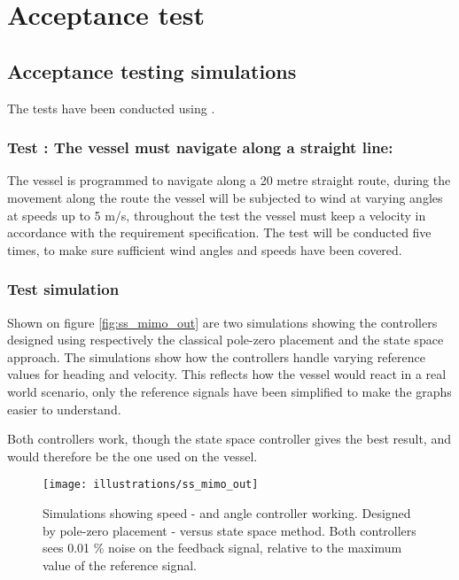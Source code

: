 \chapter{Acceptance test}


\section{Acceptance testing simulations}
The tests have been conducted using \MATLAB.

\subsection*{Test : The vessel must navigate along a straight line:}
The vessel is programmed to navigate along a 20 metre straight route, during the movement along the route the vessel will be subjected to wind at varying angles at speeds up to 5 m/s, throughout the test the vessel must keep a velocity in accordance with the requirement specification. The test will be conducted five times, to make sure sufficient wind angles and speeds have been covered.


\subsection{Test simulation}
Shown on figure \vref{fig:ss_mimo_out} are two simulations showing the controllers designed using respectively the classical pole-zero placement and the state space approach. The simulations show how the controllers handle varying reference values for heading and velocity. This reflects how the vessel would react in a real world scenario, only the reference signals have been simplified to make the graphs easier to understand.

Both controllers work, though the state space controller gives the best result, and would therefore be the one used on the vessel.

\begin{figure}[htbp]
  \centering
  \texttt{[image: illustrations/ss\_mimo\_out]}
   \caption{Simulations showing speed - and angle controller working. Designed by pole-zero placement - versus state space method. Both controllers sees 0.01 \% noise on the feedback signal, relative to the maximum value of the reference signal.}
 \label{fig:ss_mimo_out}
\end{figure}

